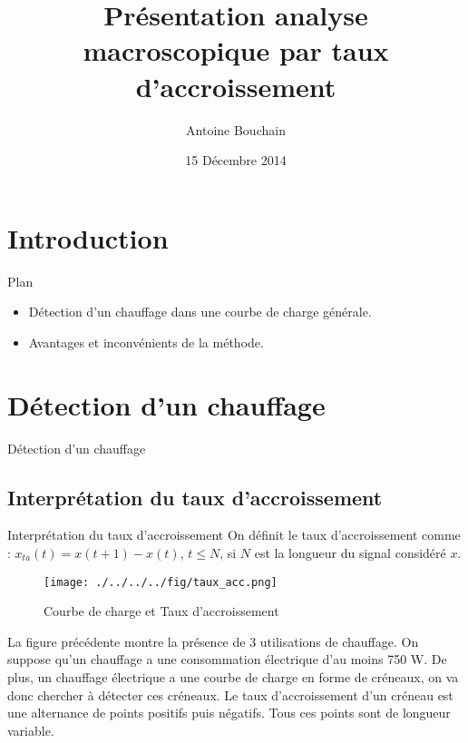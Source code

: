 \documentclass{beamer}
\title[Your Short Title]{Présentation analyse macroscopique par taux d'accroissement}
\author{Antoine Bouchain}
\date{15 Décembre 2014}
\begin{document}
\begin{frame}
  \titlepage
\end{frame}


\section{Introduction}

\begin{frame}{Plan}

\begin{itemize}
  \item Détection d'un chauffage dans une courbe de charge générale.
  \item Avantages et inconvénients de la méthode.
\end{itemize}

\vskip 1cm

\end{frame}

\section{Détection d'un chauffage}

\begin{frame}{Détection d'un chauffage}
\end{frame}

\subsection{Interprétation du taux d'accroissement}

\begin{frame}{Interprétation du taux d'accroissement}
On définit le taux d'accroissement comme : $x_{ta}(t) = x(t+1) - x(t)$, $t \le N$, si $N$ est la longueur du signal considéré $x$.
\begin{figure}[!h]
\begin{center}
\texttt{[image: ./../../../fig/taux\_acc.png]}
\caption{Courbe de charge et Taux d'accroissement}
\label{Figure1}
\end{center}
\end{figure}
\end{frame}

\begin{frame}
La figure précédente montre la présence de 3 utilisations de chauffage. On suppose qu'un chauffage a une consommation électrique d'au moins 750 W. De plus, un chauffage électrique a une courbe de charge en forme de créneaux, on va donc chercher à détecter ces créneaux. Le taux d'accroissement d'un créneau est une alternance de points positifs puis négatifs. Tous ces points sont de longueur variable.
\end{frame}
\end{document}
